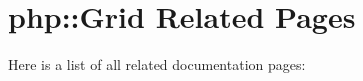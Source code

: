\section{php::Grid Related Pages}
Here is a list of all related documentation pages:\begin{CompactList}
\item {}

\end{CompactList}
